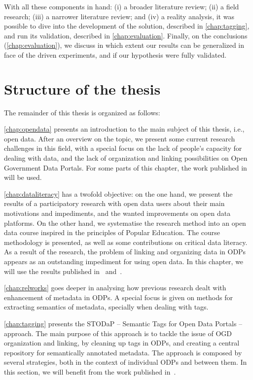 With all these components in hand: (i) a broader literature review; (ii) a field research; (iii) a narrower literature review; and (iv) a reality analysis, it was possible to dive into the development of the solution, described in \autoref{chap:tagging}, and run its validation, described in \autoref{chap:evaluation}.
Finally, on the conclusions (\autoref{chap:evaluation}), we discuss in which extent our results can be generalized in face of the driven experiments, and if our hypothesis were fully validated.

\section{Structure of the thesis}

The remainder of this thesis is organized as follows:

\autoref{chap:opendata} presents an introduction to the main subject of this thesis, i.e., open data.
After an overview on the topic, we present some current research challenges in this field, with a special focus on the lack of people's capacity for dealing with data, and the lack of organization and linking possibilities on Open Government Data Portals. 
For some parts of this chapter, the work published in~ will be used.

\autoref{chap:dataliteracy} has a twofold objective: on the one hand, we present the results of a participatory research with open data users about their main motivations and impediments, and the wanted improvements on open data platforms. 
On the other hand, we systematise the research method into an open data course inspired in the principles of Popular Education.
The course methodology is presented, as well as some contributions on critical data literacy.
As a result of the research, the problem of linking and organizing data in ODPs appears as an outstanding impediment for using open data.
In this chapter, we will use the results published in~ and~.

\autoref{chap:relworks} goes deeper in analysing how previous research dealt with enhancement of metadata in ODPs.
A special focus is given on methods for extracting semantics of metadata, specially when dealing with tags.

\autoref{chap:tagging} presents the STODaP -- Semantic Tags for Open Data Portals -- approach.
The main purpose of this approach is to tackle the issue of OGD organization and linking, by cleaning up tags in ODPs, and creating a central repository for semantically annotated metadata.
The approach is composed by several strategies, both in the context of individual ODPs and between them.
In this section, we will benefit from the work published in~.

